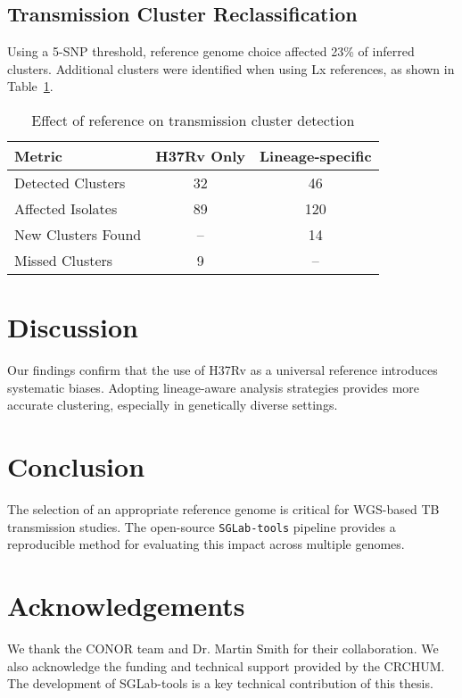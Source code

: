 \documentclass[12pt]{article}
\begin{document}
\subsection{Transmission Cluster Reclassification}
Using a 5-SNP threshold, reference genome choice affected 23\% of inferred clusters. Additional clusters were identified when using Lx references, as shown in Table~\ref{tab:clusters}.

\begin{table}[H]
\centering
\caption{Effect of reference on transmission cluster detection}
\begin{tabular}{@{}lcc@{}}
\toprule
Metric & H37Rv Only & Lineage-specific \\
\midrule
Detected Clusters & 32 & 46 \\
Affected Isolates & 89 & 120 \\
New Clusters Found & -- & 14 \\
Missed Clusters    & 9  & -- \\
\bottomrule
\end{tabular}
\label{tab:clusters}
\end{table}

\section{Discussion}
Our findings confirm that the use of H37Rv as a universal reference introduces systematic biases. Adopting lineage-aware analysis strategies provides more accurate clustering, especially in genetically diverse settings.

\section{Conclusion}
The selection of an appropriate reference genome is critical for WGS-based TB transmission studies. The open-source \texttt{SGLab-tools} pipeline provides a reproducible method for evaluating this impact across multiple genomes.

\section*{Acknowledgements}
We thank the CONOR team and Dr. Martin Smith for their collaboration. We also acknowledge the funding and technical support provided by the CRCHUM. The development of SGLab-tools is a key technical contribution of this thesis.
\end{document}
